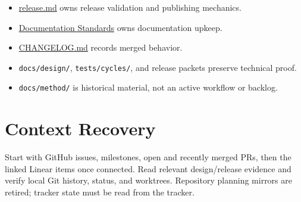 \begin{itemize}
\tightlist
\item
  \href{https://github.com/flyingrobots/bijou/blob/cbd70612140e7a450d764b3c7be1c6af878b99bc/docs/release.md}{release.md} owns release validation and publishing mechanics.
\item
  \href{https://github.com/flyingrobots/bijou/blob/cbd70612140e7a450d764b3c7be1c6af878b99bc/docs/DOCUMENTATION_STANDARDS.md}{Documentation Standards} owns documentation upkeep.
\item
  \href{https://github.com/flyingrobots/bijou/blob/cbd70612140e7a450d764b3c7be1c6af878b99bc/docs/CHANGELOG.md}{CHANGELOG.md} records merged behavior.
\item
  \texttt{d\allowbreak{}o\allowbreak{}c\allowbreak{}s\allowbreak{}/\allowbreak{}d\allowbreak{}e\allowbreak{}s\allowbreak{}i\allowbreak{}g\allowbreak{}n\allowbreak{}/}, \texttt{t\allowbreak{}e\allowbreak{}s\allowbreak{}t\allowbreak{}s\allowbreak{}/\allowbreak{}c\allowbreak{}y\allowbreak{}c\allowbreak{}l\allowbreak{}e\allowbreak{}s\allowbreak{}/}, and release packets preserve technical proof.
\item
  \texttt{d\allowbreak{}o\allowbreak{}c\allowbreak{}s\allowbreak{}/\allowbreak{}m\allowbreak{}e\allowbreak{}t\allowbreak{}h\allowbreak{}o\allowbreak{}d\allowbreak{}/} is historical material, not an active workflow or backlog.
\end{itemize}

\section{Context Recovery}\label{record-013-context-recovery}

Start with GitHub issues, milestones, open and recently merged PRs, then the linked Linear items once connected. Read relevant design/release evidence and verify local Git history, status, and worktrees. Repository planning mirrors are retired; tracker state must be read from the tracker.

